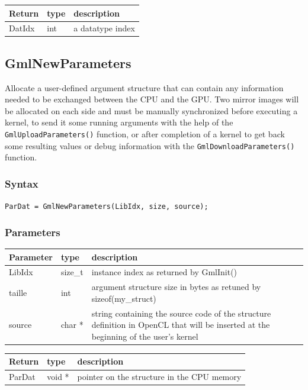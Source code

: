 \documentclass[a4paper,12pt]{article}
\begin{document}
\medskip

\begin{tabular}{|m{2cm}|m{1.5cm}|m{10.5cm}|}
\hline
Return     & type   & description \\
\hline
DatIdx     & int    & a datatype index \\
\hline
\end{tabular}


\subsection{GmlNewParameters}
Allocate a user-defined argument structure that can contain any information needed to be exchanged between the CPU and the GPU. Two mirror images will be allocated on each side and must be manually synchronized before executing a kernel, to send it some running arguments with the help of the {\tt GmlUploadParameters()} function, or after completion of a kernel to get back some resulting values or debug information with the {\tt GmlDownloadParameters()} function.

\subsubsection*{Syntax}
{\tt ParDat = GmlNewParameters(LibIdx, size, source);}

\subsubsection*{Parameters}
\begin{tabular}{|m{2cm}|m{1.5cm}|m{10.5cm}|}
\hline
Parameter  & type    & description \\
\hline
LibIdx     & size\_t & instance index as returned by GmlInit() \\
\hline
taille     & int     & argument structure size in bytes as retuned by sizeof(my\_struct) \\
\hline
source     & char *  & string containing the source code of the structure definition in OpenCL that will be inserted at the beginning of the user's kernel \\
\hline
\end{tabular}

\medskip

\begin{tabular}{|m{2cm}|m{1.5cm}|m{10.5cm}|}
\hline
Return     & type   & description \\
\hline
ParDat     & void * & pointer on the structure in the CPU memory \\
\hline
\end{tabular}
\end{document}
